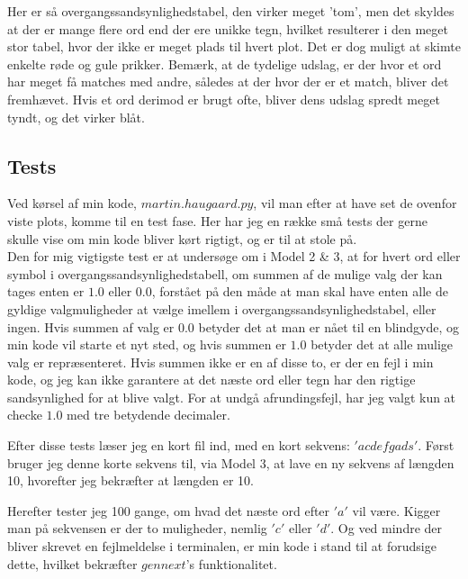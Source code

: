 \documentclass[11pt]{article} %
\begin{document}
Her er så overgangssandsynlighedstabel, den virker meget 'tom', men det skyldes at der er mange flere ord end der ere unikke tegn, hvilket resulterer i den meget stor tabel, hvor der ikke er meget plads til hvert plot. Det er dog muligt at skimte enkelte røde og gule prikker. Bemærk, at de tydelige udslag, er der hvor et ord har meget få matches med andre, således at der hvor der er et match, bliver det fremhævet. Hvis et ord derimod er brugt ofte, bliver dens udslag spredt meget tyndt, og det virker blåt.

\newpage

\subsection*{Tests}
Ved kørsel af min kode, $martin.haugaard.py$, vil man efter at have set de ovenfor viste plots, komme til en test fase. Her har jeg en række små tests der gerne skulle vise om min kode bliver kørt rigtigt, og er til at stole på.
\\
Den for mig vigtigste test er at undersøge om i Model 2 \& 3, at for hvert ord eller symbol i overgangssandsynlighedstabell, om summen af de mulige valg der kan tages enten er $1.0$ eller $0.0$, forstået på den måde at man skal have enten alle de gyldige valgmuligheder at vælge imellem i overgangssandsynlighedstabel, eller ingen. Hvis summen af valg er $0.0$ betyder det at man er nået til en blindgyde, og min kode vil starte et nyt sted, og hvis summen er $1.0$ betyder det at alle mulige valg er repræsenteret. Hvis summen ikke er en af disse to, er der en fejl i min kode, og jeg kan ikke garantere at det næste ord eller tegn har den rigtige sandsynlighed for at blive valgt. For at undgå afrundingsfejl, har jeg valgt kun at checke $1.0$ med tre betydende decimaler.

Efter disse tests læser jeg en kort fil ind, med en kort sekvens: $'a c d e f g a d s'$. Først bruger jeg denne korte sekvens til, via Model 3, at lave en ny sekvens af længden 10, hvorefter jeg bekræfter at længden er 10.

Herefter tester jeg 100 gange, om hvad det næste ord efter $'a'$ vil være. Kigger man på sekvensen er der to muligheder, nemlig  $'c'$ eller $'d'$. Og ved mindre der bliver skrevet en fejlmeldelse i terminalen, er min kode i stand til at forudsige dette, hvilket bekræfter $gennext$'s funktionalitet. 
\end{document}
